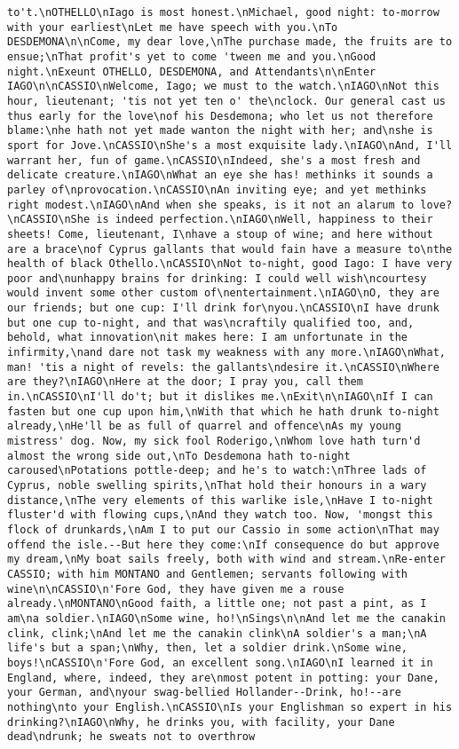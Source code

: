 \begin{verbatim}
to't.\nOTHELLO\nIago is most honest.\nMichael, good night: to-morrow with your earliest\nLet me have speech with you.\nTo DESDEMONA\n\nCome, my dear love,\nThe purchase made, the fruits are to ensue;\nThat profit's yet to come 'tween me and you.\nGood night.\nExeunt OTHELLO, DESDEMONA, and Attendants\n\nEnter IAGO\n\nCASSIO\nWelcome, Iago; we must to the watch.\nIAGO\nNot this hour, lieutenant; 'tis not yet ten o' the\nclock. Our general cast us thus early for the love\nof his Desdemona; who let us not therefore blame:\nhe hath not yet made wanton the night with her; and\nshe is sport for Jove.\nCASSIO\nShe's a most exquisite lady.\nIAGO\nAnd, I'll warrant her, fun of game.\nCASSIO\nIndeed, she's a most fresh and delicate creature.\nIAGO\nWhat an eye she has! methinks it sounds a parley of\nprovocation.\nCASSIO\nAn inviting eye; and yet methinks right modest.\nIAGO\nAnd when she speaks, is it not an alarum to love?\nCASSIO\nShe is indeed perfection.\nIAGO\nWell, happiness to their sheets! Come, lieutenant, I\nhave a stoup of wine; and here without are a brace\nof Cyprus gallants that would fain have a measure to\nthe health of black Othello.\nCASSIO\nNot to-night, good Iago: I have very poor and\nunhappy brains for drinking: I could well wish\ncourtesy would invent some other custom of\nentertainment.\nIAGO\nO, they are our friends; but one cup: I'll drink for\nyou.\nCASSIO\nI have drunk but one cup to-night, and that was\ncraftily qualified too, and, behold, what innovation\nit makes here: I am unfortunate in the infirmity,\nand dare not task my weakness with any more.\nIAGO\nWhat, man! 'tis a night of revels: the gallants\ndesire it.\nCASSIO\nWhere are they?\nIAGO\nHere at the door; I pray you, call them in.\nCASSIO\nI'll do't; but it dislikes me.\nExit\n\nIAGO\nIf I can fasten but one cup upon him,\nWith that which he hath drunk to-night already,\nHe'll be as full of quarrel and offence\nAs my young mistress' dog. Now, my sick fool Roderigo,\nWhom love hath turn'd almost the wrong side out,\nTo Desdemona hath to-night caroused\nPotations pottle-deep; and he's to watch:\nThree lads of Cyprus, noble swelling spirits,\nThat hold their honours in a wary distance,\nThe very elements of this warlike isle,\nHave I to-night fluster'd with flowing cups,\nAnd they watch too. Now, 'mongst this flock of drunkards,\nAm I to put our Cassio in some action\nThat may offend the isle.--But here they come:\nIf consequence do but approve my dream,\nMy boat sails freely, both with wind and stream.\nRe-enter CASSIO; with him MONTANO and Gentlemen; servants following with wine\n\nCASSIO\n'Fore God, they have given me a rouse already.\nMONTANO\nGood faith, a little one; not past a pint, as I am\na soldier.\nIAGO\nSome wine, ho!\nSings\n\nAnd let me the canakin clink, clink;\nAnd let me the canakin clink\nA soldier's a man;\nA life's but a span;\nWhy, then, let a soldier drink.\nSome wine, boys!\nCASSIO\n'Fore God, an excellent song.\nIAGO\nI learned it in England, where, indeed, they are\nmost potent in potting: your Dane, your German, and\nyour swag-bellied Hollander--Drink, ho!--are nothing\nto your English.\nCASSIO\nIs your Englishman so expert in his drinking?\nIAGO\nWhy, he drinks you, with facility, your Dane dead\ndrunk; he sweats not to overthrow 
\end{verbatim}
